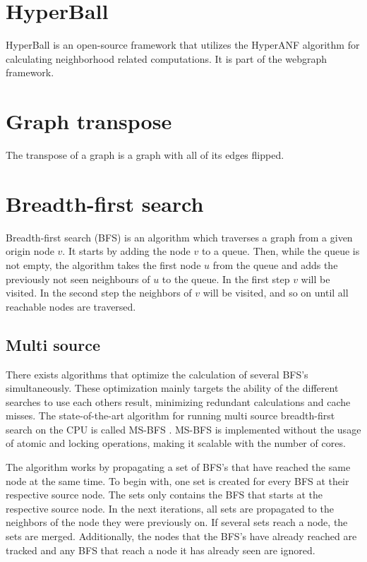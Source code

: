 \section{HyperBall}
HyperBall is an open-source framework that utilizes the HyperANF algorithm for calculating neighborhood related computations. It is part of the webgraph framework.

\section{Graph transpose}
The transpose of a graph is a graph with all of its edges flipped. 

\section{Breadth-first search}
Breadth-first search (BFS) is an algorithm which traverses a graph from a given origin node $v$. It starts by adding the node $v$ to a queue. Then, while the queue is not empty, the algorithm takes the first node $u$ from the queue and adds the previously not seen neighbours of $u$ to the queue. In the first step $v$ will be visited. In the second step the neighbors of $v$ will be visited, and so on until all reachable nodes are traversed.

\subsection{Multi source}
There exists algorithms that optimize the calculation of several BFS's simultaneously. These optimization mainly targets the ability of the different searches to use each others result, minimizing redundant calculations and cache misses. The state-of-the-art algorithm for running multi source breadth-first search on the CPU is called MS-BFS \cite{msbfs}. MS-BFS is implemented without the usage of atomic and locking operations, making it scalable with the number of cores. 

The algorithm works by propagating a set of BFS's that have reached the same node at the same time. To begin with, one set is created for every BFS at their respective source node. The sets only contains the BFS that starts at the respective source node. In the next iterations, all sets are propagated to the neighbors of the node they were previously on. If several sets reach a node, the sets are merged. Additionally, the nodes that the BFS's have already reached are tracked and any BFS that reach a node it has already seen are ignored. 

